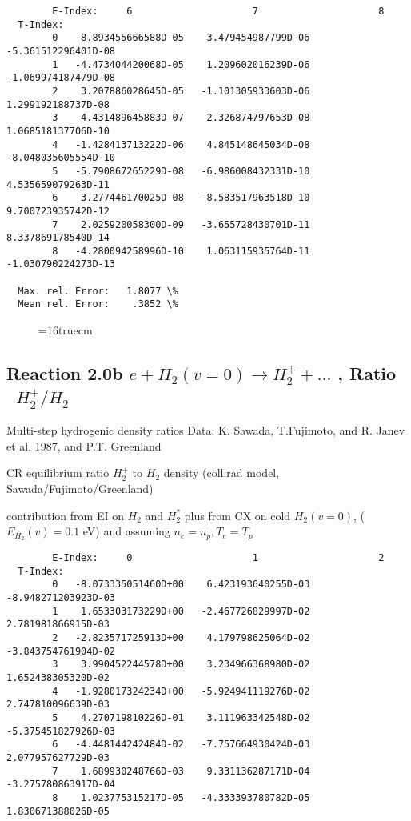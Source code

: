 \documentclass[12pt,dvipdfmx]{article}
\begin{document}
{\begin{small}
\begin{verbatim}
        E-Index:     6                     7                     8
  T-Index:
        0   -8.893455666588D-05    3.479454987799D-06   -5.361512296401D-08
        1   -4.473404420068D-05    1.209602016239D-06   -1.069974187479D-08
        2    3.207886028645D-05   -1.101305933603D-06    1.299192188737D-08
        3    4.431489645883D-07    2.326874797653D-08    1.068518137706D-10
        4   -1.428413713222D-06    4.845148645034D-08   -8.048035605554D-10
        5   -5.790867265229D-08   -6.986008432331D-10    4.535659079263D-11
        6    3.277446170025D-08   -8.583517963518D-10    9.700723935742D-12
        7    2.025920058300D-09   -3.655728430701D-11    8.337869178540D-14
        8   -4.280094258996D-10    1.063115935764D-11   -1.030790224273D-13

  Max. rel. Error:   1.8077 \%
  Mean rel. Error:    .3852 \%

\end{verbatim}\end{small}
\begin{figure} \label{h12_2.0a}
\epsfxsize=16truecm
\end{figure}

\newpage
\subsection{
Reaction 2.0b $e + H_2(v=0) \rightarrow H_2^+ + ... $ , Ratio  \ $H_2^+/H_2$
}

 Multi-step hydrogenic density ratios
 Data: K. Sawada, T.Fujimoto, \cite{kn:Sawada} and R. Janev et al, 1987, and P.T. Greenland


  CR equilibrium ratio $H_2^+$ to $H_2$ density
  (coll.rad model, Sawada/Fujimoto/Greenland)

  contribution from  EI on $H_2$ and $H_2^*$  plus from CX on cold $H_2(v=0)$,
($E_{H_2}(v)=0.1$ eV) and assuming $n_e=n_p, T_e=T_p$


\begin{small}\begin{verbatim}
        E-Index:     0                     1                     2
  T-Index:
        0   -8.073335051460D+00    6.423193640255D-03   -8.948271203923D-03
        1    1.653303173229D+00   -2.467726829997D-02    2.781981866915D-03
        2   -2.823571725913D+00    4.179798625064D-02   -3.843754761904D-02
        3    3.990452244578D+00    3.234966368980D-02    1.652438305320D-02
        4   -1.928017324234D+00   -5.924941119276D-02    2.747810096639D-03
        5    4.270719810226D-01    3.111963342548D-02   -5.375451827926D-03
        6   -4.448144242484D-02   -7.757664930424D-03    2.077957627729D-03
        7    1.689930248766D-03    9.331136287171D-04   -3.275780863917D-04
        8    1.023775315217D-05   -4.333393780782D-05    1.830671388026D-05


\end{verbatim}
\end{small}}
\end{document}
